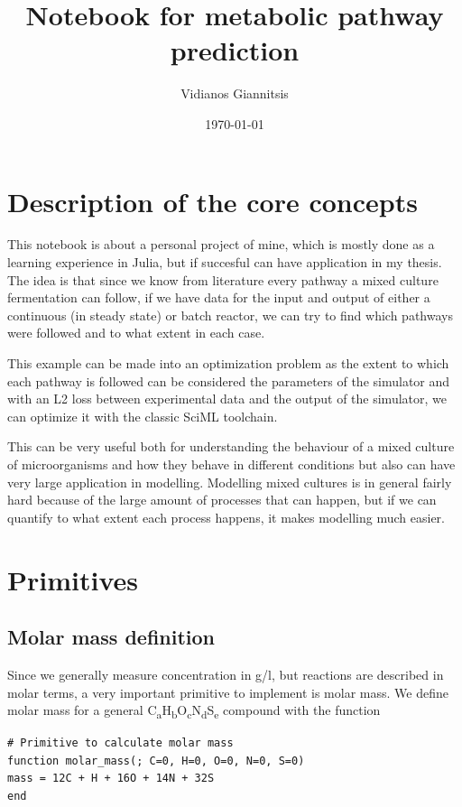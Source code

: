 \documentclass[11pt]{article}
\author{Vidianos Giannitsis}
\date{\today}
\title{Notebook for metabolic pathway prediction}
\begin{document}
\maketitle
\tableofcontents


\section{Description of the core concepts}
\label{sec:org0c70bdd}
This notebook is about a personal project of mine, which is mostly done as a learning experience in Julia, but if succesful can have application in my thesis. The idea is that since we know from literature every pathway a mixed culture fermentation can follow, if we have data for the input and output of either a continuous (in steady state) or batch reactor, we can try to find which pathways were followed and to what extent in each case.

This example can be made into an optimization problem as the extent to which each pathway is followed can be considered the parameters of the simulator and with an L2 loss between experimental data and the output of the simulator, we can optimize it with the classic SciML toolchain.

This can be very useful both for understanding the behaviour of a mixed culture of microorganisms and how they behave in different conditions but also can have very large application in modelling. Modelling mixed cultures is in general fairly hard because of the large amount of processes that can happen, but if we can quantify to what extent each process happens, it makes modelling much easier.

\section{Primitives}
\label{sec:orgf5c1853}
\subsection{Molar mass definition}
\label{sec:org0c46c8d}
Since we generally measure concentration in g/l, but reactions are described in molar terms, a very important primitive to implement is molar mass. We define molar mass for a general C\textsubscript{a}H\textsubscript{b}O\textsubscript{c}N\textsubscript{d}S\textsubscript{e} compound with the function

\begin{verbatim}
# Primitive to calculate molar mass
function molar_mass(; C=0, H=0, O=0, N=0, S=0)
mass = 12C + H + 16O + 14N + 32S
end

\end{verbatim}
\end{document}
